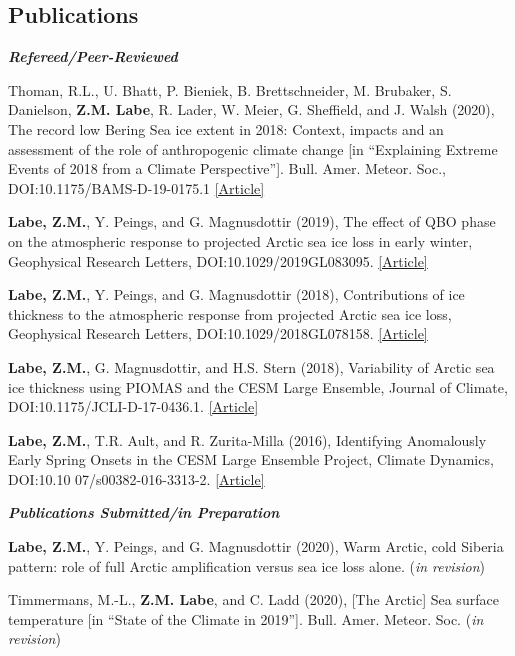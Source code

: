 \documentclass[margin,line,palatino,courier,10pt]{res}
\begin{document}
\begin{resume}
\section{\sc \large{\textcolor{Cerulean}{\textbf{Publications}}}}
\textit{\textbf{Refereed/Peer-Reviewed}}
\vspace*{-0.1in}\\
\begin{etaremune}[leftmargin=0in,topsep=0in,parsep=0in]
\item Thoman, R.L., U. Bhatt, P. Bieniek, B. Brettschneider, M. Brubaker, S. Danielson, \textbf{Z.M. Labe}, R. Lader, W. Meier, G. Sheffield, and J. Walsh (2020), The record low Bering Sea ice extent in 2018: Context, impacts and an assessment of the role of anthropogenic climate change [in ``Explaining Extreme Events of 2018 from a Climate Perspective'']. Bull. Amer. Meteor. Soc., DOI:10.1175/BAMS-D-19-0175.1 \href{https://journals.ametsoc.org/doi/abs/10.1175/BAMS-D-19-0175.1}{[Article]}
\item \textbf{Labe, Z.M.}, Y. Peings, and G. Magnusdottir (2019), The effect of QBO phase on the atmospheric response to projected Arctic sea ice loss in early winter, Geophysical Research Letters, DOI:10.1029/2019GL083095. \href{https://agupubs.onlinelibrary.wiley.com/doi/10.1029/2019GL083095}{[Article]}
\item \textbf{Labe, Z.M.}, Y. Peings, and G. Magnusdottir (2018), Contributions of ice thickness to the atmospheric response from projected Arctic sea ice loss, Geophysical Research Letters, DOI:10.1029/2018GL078158. \href{https://agupubs.onlinelibrary.wiley.com/doi/10.1029/2018GL078158}{[Article]}
\item \textbf{Labe, Z.M.}, G. Magnusdottir, and H.S. Stern (2018), Variability of Arctic sea ice thickness using PIOMAS and the CESM Large Ensemble, Journal of Climate, DOI:10.1175/JCLI-D-17-0436.1. \href{https://journals.ametsoc.org/doi/abs/10.1175/JCLI-D-17-0436.1}{[Article]}
\item \textbf{Labe, Z.M.}, T.R. Ault, and R. Zurita-Milla (2016), Identifying Anomalously Early Spring Onsets in the CESM Large Ensemble Project, Climate Dynamics, DOI:10.10 07/s00382-016-3313-2. \href{http://link.springer.com/article/10.1007/s00382-016-3313-2}{[Article]}
\end{etaremune}

\textit{\textbf{Publications Submitted/in Preparation}}
\vspace*{-0.1in}\\
\begin{etaremune}[leftmargin=0in,topsep=0in,parsep=0in]
\item \textbf{Labe, Z.M.}, Y. Peings, and G. Magnusdottir (2020), Warm Arctic, cold Siberia pattern: role of full Arctic amplification versus sea ice loss alone. (\textit{in revision})
\item Timmermans, M.-L., \textbf{Z.M. Labe}, and C. Ladd (2020), [The Arctic] Sea surface temperature [in ``State of the Climate in 2019'']. Bull. Amer. Meteor. Soc. (\textit{in revision})
\end{etaremune}


\end{resume}
\end{document}
